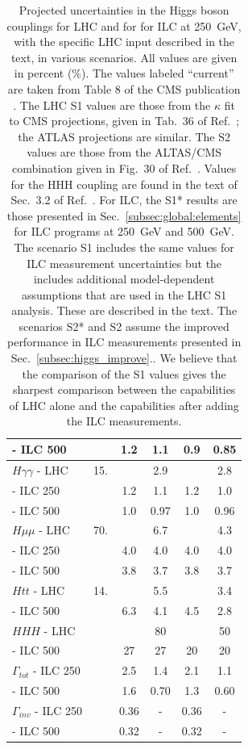 \begin{table}[!htbp]
\begin{center}
\begin{tabular}{lccccc}
\phantom{$Hcc$} - ILC 500 &      &  1.2  &  1.1   &   0.9  &  0.85 \\ 
    \hline 
$H\gamma\gamma$ - LHC  &    15.       &        &        2.9  &        & 2.8 \\ 
\phantom{$H\gamma\gamma$} - ILC 250  &      &   1.2  &  1.1  &   1.2   &  1.0\\ 
 \phantom{$H\gamma\gamma$} - ILC 500  &      &   1.0  &  0.97 &   1.0  &  0.96\\ 
\hline 
$H\mu\mu$ - LHC  &   70.        &        &    6.7  &        & 4.3 \\ 
\phantom{$H\mu\mu$} - ILC 250 &      &  4.0  &  4.0  &  4.0  &  4.0 \\ 
\phantom{$H\mu\mu$} - ILC 500 &      &  3.8  &  3.7  &  3.8  & 3.7\\ 
     \hline 
$Htt$ - LHC  &   14.        &        &           5.5   &        &  3.4
  \\  
 \phantom{$Htt$} - ILC 500  &        &    6.3    &     4.1     &    4.5   & 2.8
\\ 
\hline 
$HHH$ - LHC  &         &        &  80  &        &    50
  \\  
 \phantom{$HHH$} - ILC 500  &        &    27  &    27      &   20  & 20
\\ 
\hline \hline
$\Gamma_{tot}$ - ILC 250 &  &   2.5   &   1.4    &    2.1   & 1.1   \\ 
\phantom{$\Gamma_{tot}$} - ILC 500 & & 1.6 & 0.70 & 1.3  &  0.60  \\  \hline
$\Gamma_{inv}$ - ILC 250 &  &   0.36   &    -     &   0.36   &   -  \\ 
\phantom{$\Gamma_{inv}$} - ILC 500 & & 0.32 &  - & 0.32  & - \\  \hline
\end{tabular}
\end{center}
\caption{ \label{tab:ILCLHC}   Projected uncertainties in the Higgs
  boson couplings for LHC and for for ILC at 250~GeV, with the
  specific LHC input described in the text, 
in various scenarios.   All values
  are given in percent (\%). The values labeled ``current'' are taken
  from Table 8 of the CMS publication \cite{Sirunyan:2018koj}.   The
  LHC S1 values are those from the $\kappa$ fit to CMS projections,
  given in Tab.~36 of Ref.~\cite{Cepeda:2019klc}; the ATLAS projections are
  similar.    The S2 values are those from the ALTAS/CMS combination
  given in  Fig.~30 of Ref.~\cite{Cepeda:2019klc}.  Values for the HHH
  coupling are found in the text of Sec.~3.2 of 
Ref.~\cite{Cepeda:2019klc}. For ILC, the S1*
  results are those presented in Sec.~\ref{subsec:global:elements} for
  ILC programs at 250~GeV and 500~GeV.   The scenario S1 includes the 
same values for ILC measurement uncertainties but the  includes additional
model-dependent assumptions that are used in the LHC S1 analysis.
These are described in the text.  The
scenarios
S2* and S2 assume the improved performance in ILC measurements
presented in Sec.~\ref{subsec:higgs_improve}..  We believe that the 
comparison of the S1
  values  gives the sharpest comparison between the capabilities of LHC
  alone and the capabilities after adding the ILC measurements. }
\end{table}
